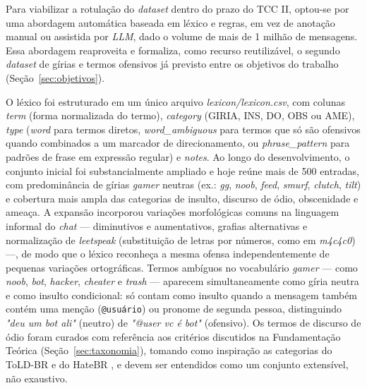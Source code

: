 \documentclass{eic-bcc-tcc}
\begin{document}
Para viabilizar a rotulação do \textit{dataset} dentro do prazo do TCC II, optou-se por uma abordagem automática baseada em léxico e regras, em vez de anotação manual ou assistida por \textit{LLM}, dado o volume de mais de 1 milhão de mensagens. Essa abordagem reaproveita e formaliza, como recurso reutilizável, o segundo \textit{dataset} de gírias e termos ofensivos já previsto entre os objetivos do trabalho (Seção~\ref{sec:objetivos}).

O léxico foi estruturado em um único arquivo \textit{lexicon/lexicon.csv}, com colunas \textit{term} (forma normalizada do termo), \textit{category} (GIRIA, INS, DO, OBS ou AME), \textit{type} (\textit{word} para termos diretos, \textit{word\_ambiguous} para termos que só são ofensivos quando combinados a um marcador de direcionamento, ou \textit{phrase\_pattern} para padrões de frase em expressão regular) e \textit{notes}. Ao longo do desenvolvimento, o conjunto inicial foi substancialmente ampliado e hoje reúne mais de 500 entradas, com predominância de gírias \textit{gamer} neutras (ex.: \textit{gg}, \textit{noob}, \textit{feed}, \textit{smurf}, \textit{clutch}, \textit{tilt}) e cobertura mais ampla das categorias de insulto, discurso de ódio, obscenidade e ameaça. A expansão incorporou variações morfológicas comuns na linguagem informal do \textit{chat} — diminutivos e aumentativos, grafias alternativas e normalização de \textit{leetspeak} (substituição de letras por números, como em \textit{m4c4c0}) —, de modo que o léxico reconheça a mesma ofensa independentemente de pequenas variações ortográficas. Termos ambíguos no vocabulário \textit{gamer} — como \textit{noob}, \textit{bot}, \textit{hacker}, \textit{cheater} e \textit{trash} — aparecem simultaneamente como gíria neutra e como insulto condicional: só contam como insulto quando a mensagem também contém uma menção (\texttt{@usuário}) ou pronome de segunda pessoa, distinguindo \textit{"deu um bot ali"} (neutro) de \textit{"@user vc é bot"} (ofensivo). Os termos de discurso de ódio foram curados com referência aos critérios discutidos na Fundamentação Teórica (Seção~\ref{sec:taxonomia}), tomando como inspiração as categorias do ToLD-BR \cite{ricarte2025contextual} e do HateBR \cite{vargas2022hatebr}, e devem ser entendidos como um conjunto extensível, não exaustivo.
\end{document}
